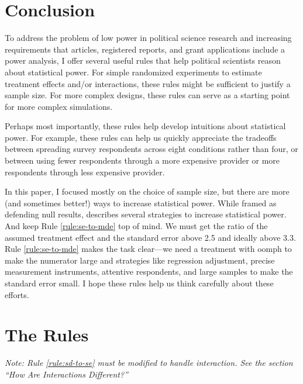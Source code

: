 \documentclass[12pt]{article}
\begin{document}
\section*{Conclusion}

To address the problem of low power in political science research \citep{ArelBundock2022} and increasing requirements that articles, registered reports, and grant applications include a power analysis, I offer several useful rules that help political scientists reason about statistical power. 
For simple randomized experiments to estimate treatment effects and/or interactions, these rules might be sufficient to justify a sample size.
For more complex designs, these rules can serve as a starting point for more complex simulations.

Perhaps most importantly, these rules help develop intuitions about statistical power. 
For example, these rules can help us quickly appreciate the tradeoffs between spreading survey respondents across eight conditions rather than four, or between using fewer respondents through a more expensive provider or more respondents through less expensive provider.

In this paper, I focused mostly on the choice of sample size, but there are more (and sometimes better!) ways to increase statistical power. 
While framed as defending null results, \cite{Kane2024} describes several strategies to increase statistical power. 
And keep Rule \ref{rule:se-to-mde} top of mind. 
We must get the ratio of the assumed treatment effect and the standard error above 2.5 and ideally above 3.3. 
Rule \ref{rule:se-to-mde} makes the task clear---we need a treatment with oomph to make the numerator large and strategies like regression adjustment, precise measurement instruments, attentive respondents, and large samples to make the standard error small.
I hope these rules help us think carefully about these efforts.


\singlespace
\clearpage
\small



\appendix
\doublespace


\section{The Rules}

{}
{}

{\noindent \footnotesize\textit{Note: Rule \ref{rule:sd-to-se} must be modified to handle interaction. See the section ``How Are Interactions Different?''}}
\end{document}
